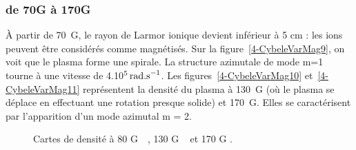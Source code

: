 \begin{refsection}
\subsubsection{de 70G à 170G}
À partir de 70~G, le rayon de Larmor ionique devient inférieur à 5 cm : les ions
peuvent être considérés comme magnétisés.
Sur la figure~\ref{4-CybeleVarMag9}, on voit que le
plasma forme une spirale. La structure azimutale de mode m=1 tourne à une
vitesse de 4.10$^{{5}}\,\text{rad.s}^{{-1}}$. Les
figures~\ref{4-CybeleVarMag10} et~\ref{4-CybeleVarMag11} représentent la densité
du plasma à 130~G (où le plasma se déplace en effectuant une rotation presque
solide) et 170~G. Elles se caractérisent par l'apparition d'un mode azimutal
m = 2.
\begin{figure}[!htbp]
  \centering
    \caption{Cartes de densité à 80 G~~, 130 G
    ~ et 170 G .}
    \label{4-CybeleVarMag-3}
\end{figure}


\end{refsection}
